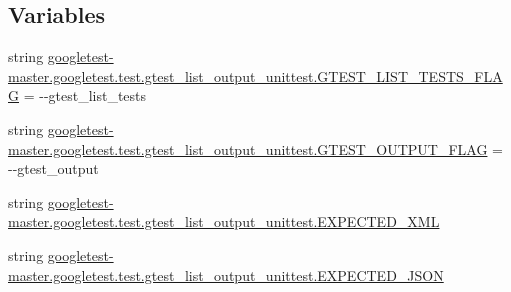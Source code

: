 \subsection*{Variables}
\begin{DoxyCompactItemize}
\item 
string \mbox{\hyperlink{namespacegoogletest-master_1_1googletest_1_1test_1_1gtest__list__output__unittest_a89dd3d6eb6cd880f8ac71db9e2ffccc0}{googletest-\/master.\+googletest.\+test.\+gtest\+\_\+list\+\_\+output\+\_\+unittest.\+G\+T\+E\+S\+T\+\_\+\+L\+I\+S\+T\+\_\+\+T\+E\+S\+T\+S\+\_\+\+F\+L\+AG}} = \textquotesingle{}-\/-\/gtest\+\_\+list\+\_\+tests\textquotesingle{}
\item 
string \mbox{\hyperlink{namespacegoogletest-master_1_1googletest_1_1test_1_1gtest__list__output__unittest_a144a401f9fa9fd2eb13333eb76c33cc2}{googletest-\/master.\+googletest.\+test.\+gtest\+\_\+list\+\_\+output\+\_\+unittest.\+G\+T\+E\+S\+T\+\_\+\+O\+U\+T\+P\+U\+T\+\_\+\+F\+L\+AG}} = \textquotesingle{}-\/-\/gtest\+\_\+output\textquotesingle{}
\item 
string \mbox{\hyperlink{namespacegoogletest-master_1_1googletest_1_1test_1_1gtest__list__output__unittest_a3862058e035fbbd406ad87b044c9feb8}{googletest-\/master.\+googletest.\+test.\+gtest\+\_\+list\+\_\+output\+\_\+unittest.\+E\+X\+P\+E\+C\+T\+E\+D\+\_\+\+X\+ML}}
\item 
string \mbox{\hyperlink{namespacegoogletest-master_1_1googletest_1_1test_1_1gtest__list__output__unittest_a27308cd6794151789f7d93fad3df7121}{googletest-\/master.\+googletest.\+test.\+gtest\+\_\+list\+\_\+output\+\_\+unittest.\+E\+X\+P\+E\+C\+T\+E\+D\+\_\+\+J\+S\+ON}}
\end{DoxyCompactItemize}
